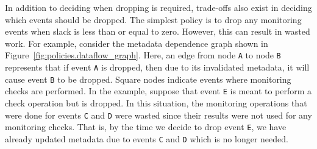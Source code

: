 In addition to deciding when dropping is required, trade-offs also exist in
deciding which events should be dropped.
The simplest policy is to drop any monitoring events when slack is less than or equal to zero.  However, this can result in
wasted work. For example, consider the metadata dependence graph shown in
Figure~\ref{fig:policies.dataflow_graph}. Here, an edge from node {\tt A} to node
{\tt B} represents that if event {\tt A} is dropped, then due to its
invalidated metadata, it will cause event {\tt B} to be dropped. Square
nodes indicate events where monitoring checks are performed. In the
example, suppose that event {\tt E} is meant to perform a check operation but is dropped.
In this situation, the
monitoring operations that were done for events {\tt C} and {\tt D} were wasted
since their results were not used for any monitoring checks.
That is, by the time we decide to drop event {\tt E}, we have already 
updated metadata due to events {\tt C} and {\tt D} which is no longer needed.

